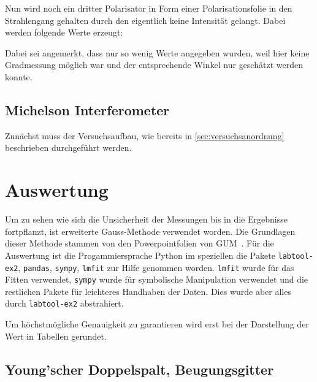 \documentclass[12pt,english,ngerman]{scrartcl}
\begin{document}

Nun wird noch ein dritter Polarisator in Form einer Polarisationsfolie in den Strahlengang gehalten durch den eigentlich keine
Intensität gelangt. Dabei werden folgende Werte erzeugt:


Dabei sei angemerkt, dass nur so wenig Werte angegeben wurden, weil hier keine Gradmessung möglich war und der entsprechende 
Winkel nur geschätzt werden konnte.


\subsection{Michelson Interferometer}

Zunächst muss der Versuchsaufbau, wie bereits in \autoref{sec:versuchsanordnung} beschrieben durchgeführt werden.





\section{Auswertung}\label{sec:auswertung}

Um zu sehen wie sich die Unsicherheit der Messungen bis in die Ergebnisse
fortpflanzt, ist erweiterte Gauss-Methode verwendet worden. Die Grundlagen
dieser Methode stammen von den Powerpointfolien von
GUM~\cite{wolfgang_kessel_isobipm-gum_2004}. Für die Auswertung ist die
Progammiersprache Python im speziellen die Pakete \verb#labtool-ex2#,
\verb#pandas#, \verb#sympy#, \verb#lmfit# zur Hilfe genommen worden.
\verb#lmfit# wurde für das Fitten verwendet, \verb#sympy# wurde für symbolische
Manipulation verwendet und die restlichen Pakete für leichteres Handhaben der
Daten. Dies wurde aber alles durch \verb#labtool-ex2# abstrahiert.

Um höchstmögliche Genauigkeit zu garantieren wird erst bei der Darstellung der
Wert in Tabellen gerundet.

\subsection{Young'scher Doppelspalt, Beugungsgitter}

\end{document}
